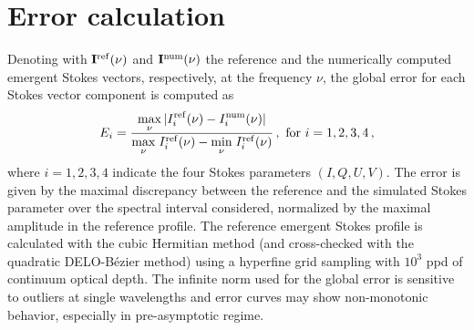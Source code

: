 \documentclass[iop,numberedappendix,twocolappendix,twocolumn]{emulateapj}
\begin{document}
\section{Error calculation}\label{appendix:A}
%
Denoting with $\mathbf I^{\rm ref}(\nu)$ and $\mathbf I^{\rm num}(\nu)$ the reference and the numerically computed emergent Stokes vectors, respectively, at the frequency $\nu$, the global error for each Stokes vector component is computed as 
%
\begin{equation}
E_i=\frac{\displaystyle \max_{\nu}| I_i^{\rm ref}(\nu)- I_i^{\rm num}(\nu)|}{{\displaystyle \max_{\nu}} \; I_i^{\rm ref}(\nu)-{\displaystyle\min_{\nu}} \; I_i^{\rm ref}(\nu)}\,,
\text{ for }i=1,2,3,4\,,
\label{error}
\end{equation}
%
where $i=1,2,3,4$ indicate the four Stokes parameters $(I,Q,U,V)$. The error is given by the maximal discrepancy between the reference and the simulated Stokes parameter over the spectral interval considered, normalized by the maximal amplitude in the reference profile. The reference emergent Stokes profile is calculated with the cubic Hermitian method (and cross-checked with the quadratic DELO-B\'ezier method) using a hyperfine grid sampling with $10^3$ ppd of continuum optical depth.
The infinite norm used for the global error is sensitive to outliers at single wavelengths and error curves may show non-monotonic behavior, especially in pre-asymptotic regime.
\end{document}
